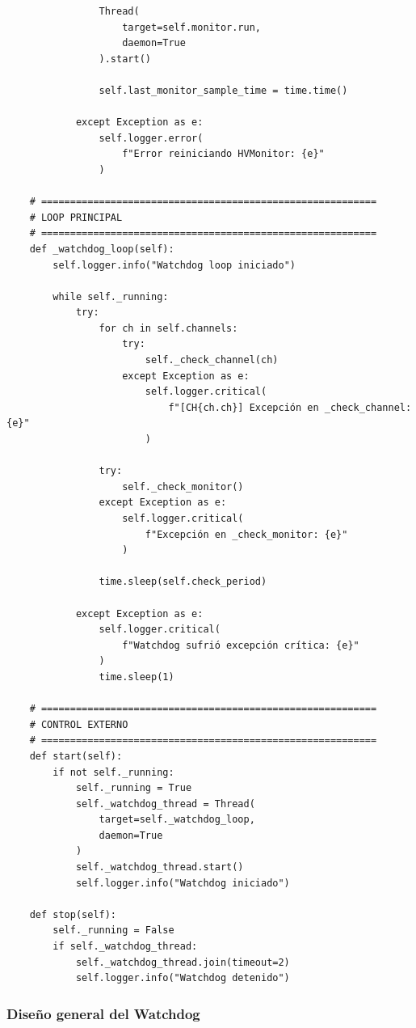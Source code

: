 \documentclass{article}
\begin{document}
\begin{lstlisting}
                Thread(
                    target=self.monitor.run,
                    daemon=True
                ).start()

                self.last_monitor_sample_time = time.time()

            except Exception as e:
                self.logger.error(
                    f"Error reiniciando HVMonitor: {e}"
                )

    # ==========================================================
    # LOOP PRINCIPAL
    # ==========================================================
    def _watchdog_loop(self):
        self.logger.info("Watchdog loop iniciado")

        while self._running:
            try:
                for ch in self.channels:
                    try:
                        self._check_channel(ch)
                    except Exception as e:
                        self.logger.critical(
                            f"[CH{ch.ch}] Excepción en _check_channel: {e}"
                        )

                try:
                    self._check_monitor()
                except Exception as e:
                    self.logger.critical(
                        f"Excepción en _check_monitor: {e}"
                    )

                time.sleep(self.check_period)

            except Exception as e:
                self.logger.critical(
                    f"Watchdog sufrió excepción crítica: {e}"
                )
                time.sleep(1)

    # ==========================================================
    # CONTROL EXTERNO
    # ==========================================================
    def start(self):
        if not self._running:
            self._running = True
            self._watchdog_thread = Thread(
                target=self._watchdog_loop,
                daemon=True
            )
            self._watchdog_thread.start()
            self.logger.info("Watchdog iniciado")

    def stop(self):
        self._running = False
        if self._watchdog_thread:
            self._watchdog_thread.join(timeout=2)
            self.logger.info("Watchdog detenido")

\end{lstlisting}

\subsubsection{Diseño general del Watchdog}
\end{document}
